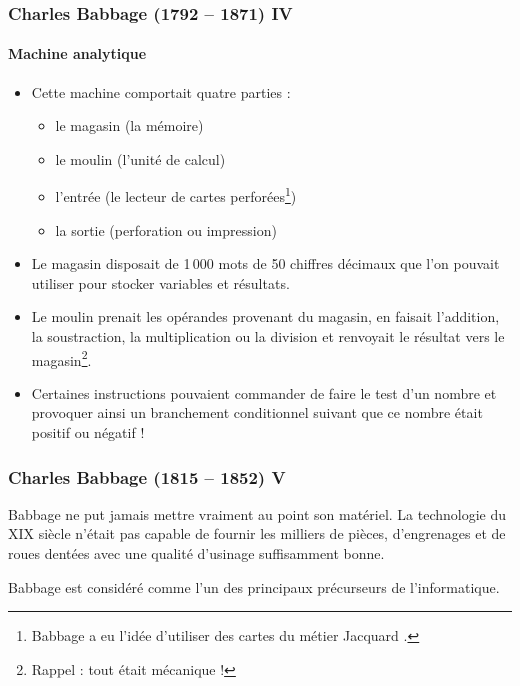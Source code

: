 \documentclass[utf8,10pt]{beamer}
\begin{document}
\begin{frame}
    \frametitle{Charles Babbage (1792 -- 1871) IV}
    \framesubtitle{Machine analytique}
    
    \begin{itemize}
        \item Cette machine comportait quatre parties :
        \begin{itemize}
            \item le magasin (la mémoire)
            \item le moulin (l'unité de calcul)
            \item l'entrée (le lecteur de cartes perforées\footnote{Babbage a eu l'idée d'utiliser 
            des cartes du \alert{métier Jacquard} \hyperlink{http://fr.wikipedia.org/wiki/Métier_Jacquard}%
            {}.})
            \item la sortie (perforation ou impression)
        \end{itemize}
        
        \item Le magasin disposait de 1\,000 mots de 50 chiffres décimaux que l'on pouvait utiliser
        pour stocker variables et résultats.
        
        \item Le moulin prenait les opérandes provenant du magasin, en faisait l'addition, la soustraction,
        la multiplication ou la division et renvoyait le résultat vers le magasin\footnote{Rappel : tout 
        était mécanique !}.
        
        \item Certaines instructions pouvaient commander de faire le test d'un nombre et provoquer
        ainsi un branchement conditionnel suivant que ce nombre était positif ou négatif !
        
    \end{itemize}

\end{frame}
    
\begin{frame}
    \frametitle{Charles Babbage (1815 -- 1852) V}
    \begin{block}{}
        Babbage ne put jamais mettre vraiment au point son matériel. La technologie du XIX siècle
        n'était pas capable de fournir les milliers de pièces, d'engrenages et de roues dentées avec une
        qualité d'usinage suffisamment bonne.
    \end{block}
    
    \vfill
    
    \begin{block}{}
    Babbage est considéré comme l'un des principaux précurseurs de l'informatique.
    \end{block}
    
    \vfill

\end{frame}
\end{document}
